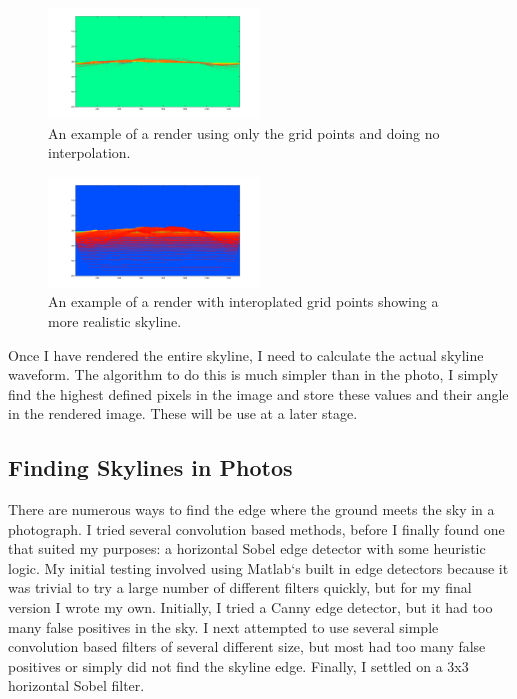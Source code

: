 \documentclass{acm_proc_article-sp}
\begin{document}
\begin{figure}
	\centering
	\includegraphics[width=0.5\textwidth]{tetonsRenderPoints.png}
	\caption{An example of a render using only the grid points and doing no interpolation.}
	\label{fig:tetPoints}
\end{figure}
\begin{figure}
	\centering
	\includegraphics[width=0.5\textwidth]{uncleaned_render_of_tetons.png}
	\caption{An example of a render with interoplated grid points showing a more realistic skyline.}
	\label{fig:tetGood}
\end{figure}
    Once I have rendered the entire skyline, I need to calculate the actual skyline waveform.  The algorithm to do this is much simpler than in the photo, I simply find the highest defined pixels in the image and store these values and their angle in the rendered image. These will be use at a later stage.

\subsection{Finding Skylines in Photos}
    There are numerous ways to find the edge where the ground meets the sky in a photograph.  I tried several convolution based methods, before I finally found one that suited my purposes:  a horizontal Sobel edge detector with some heuristic logic.  My initial testing involved using Matlab`s built in edge detectors \cite{mcandrew2004introduction} because it was trivial to try a large number of different filters quickly, but for my final version I wrote my own.  Initially, I tried a Canny edge detector, but it had too many false positives in the sky.  I next attempted to use several simple convolution \cite{Schafer:DSP} based filters of several different size, but most had too many false positives or simply did not find the skyline edge.  Finally, I settled on a 3x3 horizontal Sobel filter. \cite{behringer2002registration}  
\end{document}
